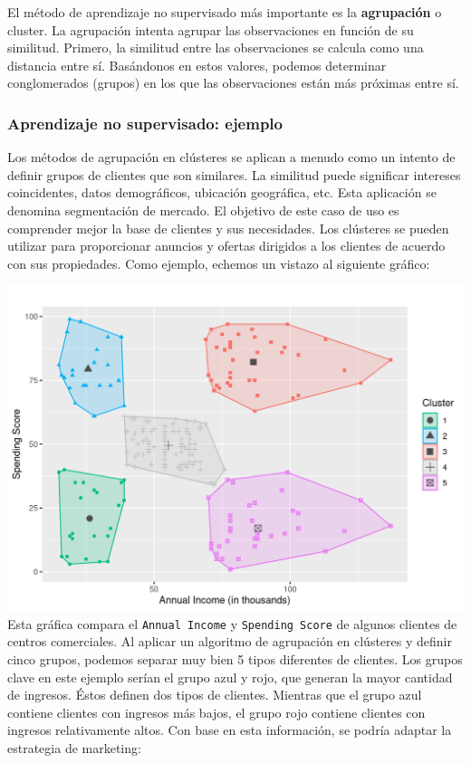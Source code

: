 \documentclass[
]{book}
\begin{document}
El método de aprendizaje no supervisado más importante es la \textbf{agrupación} o cluster. La agrupación intenta agrupar las observaciones en función de su similitud. Primero, la similitud entre las observaciones se calcula como una distancia entre sí. Basándonos en estos valores, podemos determinar conglomerados (grupos) en los que las observaciones están más próximas entre sí.

\hypertarget{aprendizaje-no-supervisado-ejemplo}{%
\subsubsection{Aprendizaje no supervisado: ejemplo}\label{aprendizaje-no-supervisado-ejemplo}}

Los métodos de agrupación en clústeres se aplican a menudo como un intento de definir grupos de clientes que son similares. La similitud puede significar intereses coincidentes, datos demográficos, ubicación geográfica, etc. Esta aplicación se denomina segmentación de mercado. El objetivo de este caso de uso es comprender mejor la base de clientes y sus necesidades. Los clústeres se pueden utilizar para proporcionar anuncios y ofertas dirigidos a los clientes de acuerdo con sus propiedades. Como ejemplo, echemos un vistazo al siguiente gráfico:

\includegraphics{img/cluster.png}
Esta gráfica compara el \texttt{Annual\ Income} y \texttt{Spending\ Score} de algunos clientes de centros comerciales. Al aplicar un algoritmo de agrupación en clústeres y definir cinco grupos, podemos separar muy bien 5 tipos diferentes de clientes. Los grupos clave en este ejemplo serían el grupo azul y rojo, que generan la mayor cantidad de ingresos. Éstos definen dos tipos de clientes. Mientras que el grupo azul contiene clientes con ingresos más bajos, el grupo rojo contiene clientes con ingresos relativamente altos. Con base en esta información, se podría adaptar la estrategia de marketing:
\end{document}
